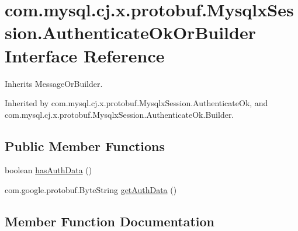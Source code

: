 \hypertarget{interfacecom_1_1mysql_1_1cj_1_1x_1_1protobuf_1_1_mysqlx_session_1_1_authenticate_ok_or_builder}{}\section{com.\+mysql.\+cj.\+x.\+protobuf.\+Mysqlx\+Session.\+Authenticate\+Ok\+Or\+Builder Interface Reference}
\label{interfacecom_1_1mysql_1_1cj_1_1x_1_1protobuf_1_1_mysqlx_session_1_1_authenticate_ok_or_builder}


Inherits Message\+Or\+Builder.



Inherited by com.\+mysql.\+cj.\+x.\+protobuf.\+Mysqlx\+Session.\+Authenticate\+Ok, and com.\+mysql.\+cj.\+x.\+protobuf.\+Mysqlx\+Session.\+Authenticate\+Ok.\+Builder.

\subsection*{Public Member Functions}
\begin{DoxyCompactItemize}
\item 
boolean \mbox{\hyperlink{interfacecom_1_1mysql_1_1cj_1_1x_1_1protobuf_1_1_mysqlx_session_1_1_authenticate_ok_or_builder_a4dbbd5a3164985cb661fa162414e2cb5}{has\+Auth\+Data}} ()
\item 
com.\+google.\+protobuf.\+Byte\+String \mbox{\hyperlink{interfacecom_1_1mysql_1_1cj_1_1x_1_1protobuf_1_1_mysqlx_session_1_1_authenticate_ok_or_builder_ae5f6e6dcc8abe8ce11b976e66ad228d8}{get\+Auth\+Data}} ()
\end{DoxyCompactItemize}


\subsection{Member Function Documentation}
\mbox{\label{interfacecom_1_1mysql_1_1cj_1_1x_1_1protobuf_1_1_mysqlx_session_1_1_authenticate_ok_or_builder_ae5f6e6dcc8abe8ce11b976e66ad228d8}} 
